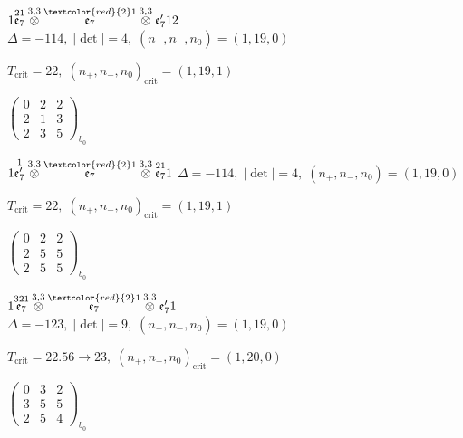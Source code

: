 \documentclass[10pt]{article}
\begin{document}
$1\overset{21}{\mathfrak{e}_7}\overset{3,3}{\otimes}\overset{\textcolor{red}{2}1}{\mathfrak{e}_7}\overset{3,3}{\otimes}\mathfrak{e}_7'12$ \quad $\Delta=-114,\; |\det|=4,\; (n_+,n_-,n_0)=(1,19,0)$

\hspace{1em}$T_{\text{crit}}=22,\; (n_+,n_-,n_0)_{\text{crit}}=(1,19,1)$

\hspace{2em}$\left(\begin{smallmatrix}0 & 2 & 2 \\ 2 & 1 & 3 \\ 2 & 3 & 5\end{smallmatrix}\right)_{\!b_0}$

\smallskip

$1\overset{1}{\mathfrak{e}_7'}\overset{3,3}{\otimes}\overset{\textcolor{red}{2}1}{\mathfrak{e}_7}\overset{3,3}{\otimes}\overset{21}{\mathfrak{e}_7}1$ \quad $\Delta=-114,\; |\det|=4,\; (n_+,n_-,n_0)=(1,19,0)$

\hspace{1em}$T_{\text{crit}}=22,\; (n_+,n_-,n_0)_{\text{crit}}=(1,19,1)$

\hspace{2em}$\left(\begin{smallmatrix}0 & 2 & 2 \\ 2 & 5 & 5 \\ 2 & 5 & 5\end{smallmatrix}\right)_{\!b_0}$

\smallskip

$1\overset{321}{\mathfrak{e}_7}\overset{3,3}{\otimes}\overset{\textcolor{red}{2}1}{\mathfrak{e}_7}\overset{3,3}{\otimes}\mathfrak{e}_7'1$ \quad $\Delta=-123,\; |\det|=9,\; (n_+,n_-,n_0)=(1,19,0)$

\hspace{1em}$T_{\text{crit}}=22.56 \to 23,\; (n_+,n_-,n_0)_{\text{crit}}=(1,20,0)$

\hspace{2em}$\left(\begin{smallmatrix}0 & 3 & 2 \\ 3 & 5 & 5 \\ 2 & 5 & 4\end{smallmatrix}\right)_{\!b_0}$
\end{document}
